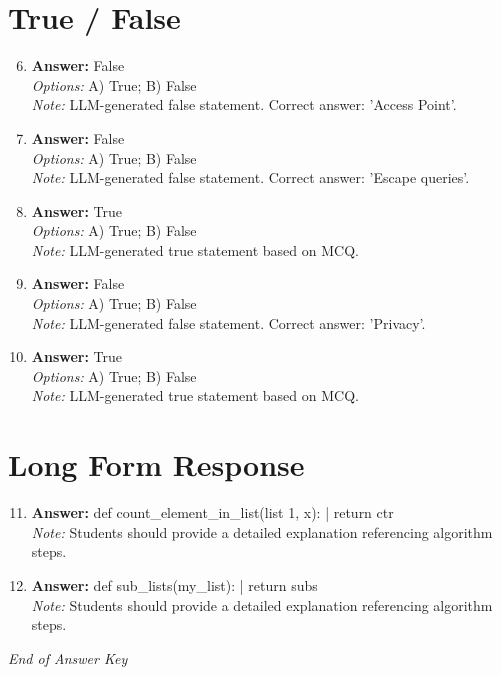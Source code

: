 \documentclass[12pt]{article}
\begin{document}
\section*{True / False}
\begin{enumerate}[label=\arabic*.]
\setcounter{enumi}{5}
\item \textbf{Answer:} False
\\ \textit{Options:} A) True; B) False
\\ \textit{Note:} LLM-generated false statement. Correct answer: 'Access Point'.
\item \textbf{Answer:} False
\\ \textit{Options:} A) True; B) False
\\ \textit{Note:} LLM-generated false statement. Correct answer: 'Escape queries'.
\item \textbf{Answer:} True
\\ \textit{Options:} A) True; B) False
\\ \textit{Note:} LLM-generated true statement based on MCQ.
\item \textbf{Answer:} False
\\ \textit{Options:} A) True; B) False
\\ \textit{Note:} LLM-generated false statement. Correct answer: 'Privacy'.
\item \textbf{Answer:} True
\\ \textit{Options:} A) True; B) False
\\ \textit{Note:} LLM-generated true statement based on MCQ.
\end{enumerate}

\section*{Long Form Response}
\begin{enumerate}[label=\arabic*.]
\setcounter{enumi}{10}
\item \textbf{Answer:} def count\_element\_in\_list(list 1, x): | return ctr
\\ \textit{Note:} Students should provide a detailed explanation referencing algorithm steps.
\item \textbf{Answer:} def sub\_lists(my\_list): | return subs
\\ \textit{Note:} Students should provide a detailed explanation referencing algorithm steps.
\end{enumerate}

\vfill
\noindent\textit{End of Answer Key}
\end{document}
